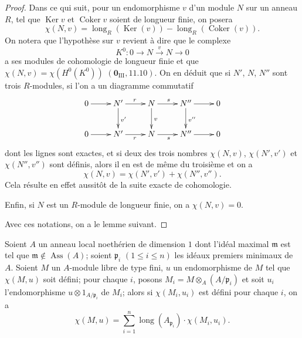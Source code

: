 \begin{proof}
Dans ce qui suit, pour un endomorphisme $v$ d'un module $N$ sur un anneau $R$, tel que $\operatorname{Ker}v$ et $\operatorname{Coker}v$ soient de longueur finie, on posera
\[
  \chi(N,v)=\operatorname{long}_R(\operatorname{Ker}(v))-\operatorname{long}_R(\operatorname{Coker}(v)).
\]
On notera que l'hypothèse sur $v$ revient à dire que le complexe
\[
  K^0:0\to N\xrightarrow{v}N\to0
\]
a ses modules de cohomologie de longueur finie et que $\chi(N,v)=\chi(H^0(K^0))$ $(\mathbf{0}_{\mathrm{III}},11.10)$.
On en déduit que si $N'$, $N$, $N''$ sont trois $R$-modules, si l'on a un diagramme commutatif
\[
  \xymatrix{
    0 \ar[r] & N' \ar[r]^r \ar[d]^{v'} & N \ar[r]^s \ar[d]^v & N'' \ar[r] \ar[d]^{v''} & 0\\
    0 \ar[r] & N' \ar[r]_r & N \ar[r]_s & N'' \ar[r] & 0
  }
\]
dont les lignes sont exactes, et si deux des trois nombres $\chi(N,v)$, $\chi(N',v')$ et $\chi(N'',v'')$ sont définis, alors il en est de même du troisième et on a
\[
\label{IV.21.10.17.6}
  \chi(N,v)=\chi(N',v')+\chi(N'',v'').
  \tag{21.10.17.6}
\]
Cela résulte en effet aussitôt de la suite exacte de cohomologie.

Enfin, si $N$ est un $R$-module de longueur finie, on a $\chi(N,v)=0$.

Avec ces notations, on a le lemme suivant.
\end{proof}

\begin{lemma}[21.10.17.7]
\label{IV.21.10.17.7}
Soient $A$ un anneau local noethérien de dimension $1$ dont l'idéal maximal $\mathfrak{m}$ est tel que $\mathfrak{m}\notin\operatorname{Ass}(A)$;
soient $\mathfrak{p}_i$ $(1\leq i\leq n)$ les idéaux premiers minimaux de $A$.
Soient $M$ un $A$-module libre de type fini, $u$ un endomorphisme de $M$ tel que $\chi(M,u)$ soit défini;
pour chaque $i$, posons $M_i=M\otimes_A(A/\mathfrak{p}_i)$ et soit $u_i$ l'endomorphisme $u\otimes1_{A/\mathfrak{p}_i}$ de $M_i$;
alors si $\chi(M_i,u_i)$ est défini pour chaque $i$, on a
\[
\label{IV.21.10.17.8}
  \chi(M,u)=\sum_{i=1}^n\operatorname{long}(A_{\mathfrak{p}_i})\cdot\chi(M_i,u_i).
  \tag{21.10.17.8}
\]
\end{lemma}

